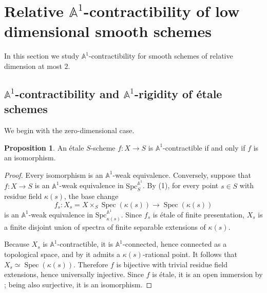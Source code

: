 \documentclass[10pt]{amsart}
\renewcommand{\AA}{\mathbb{A}}
\newcommand{\Spec}{\operatorname{Spec}}
\numberwithin{equation}{section} %
\theoremstyle{plain}
\theoremstyle{definition}
\newtheorem{prop}[prop]{Proposition}
\theoremstyle{remark}
\begin{document}
\section{Relative \texorpdfstring{$\AA^1$}{A1}-contractibility of low dimensional smooth schemes }


In this section we study $\AA^1$-contractibility for smooth schemes of relative dimension at most $2$. 
%



\subsection{\texorpdfstring{$\AA^1$}{A1}-contractibility and \texorpdfstring{$\AA^1$}{A1}-rigidity of \'etale schemes}
\label{sect:0-dim schemes}

We begin with the zero-dimensional case.

\begin{prop}\label{0-dim prop}
An \'etale $S$-scheme $f:X\to S$ is $\AA^1$-contractible if and only if $f$ is an isomorphism. 
\end{prop}

\begin{proof}
Every isomorphism is an $\AA^1$-weak equivalence. Conversely, suppose that $f:X\to S$ is an $\AA^1$-weak equivalence in $\mathrm{Spc}_S^{\AA^1}$. By (1), for every point $s\in S$ with residue field $\kappa(s)$, the base change
\[
f_s:X_s=X\times_S \Spec(\kappa(s))\to \Spec(\kappa(s))
\]
is an $\AA^1$-weak equivalence in $\mathrm{Spc}_{\kappa(s)}^{\AA^1}$. Since $f_s$ is \'etale of finite presentation, $X_s$ is a finite disjoint union of spectra of finite separable extensions of $\kappa(s)$. 
\medskip

Because $X_s$ is $\AA^1$-contractible, it is $\AA^1$-connected, hence connected as a topological space, and by  it admits a $\kappa(s)$-rational point. It follows that $X_s\simeq \Spec(\kappa(s))$. Therefore $f$ is bijective with trivial residue field extensions, hence universally injective. Since $f$ is \'etale, it is an open immersion by \cite[\href{https://stacks.math.columbia.edu/tag/02LC}{Tag 02LC}]{stacks-project}; being also surjective, it is an isomorphism.
\end{proof}
\end{document}
